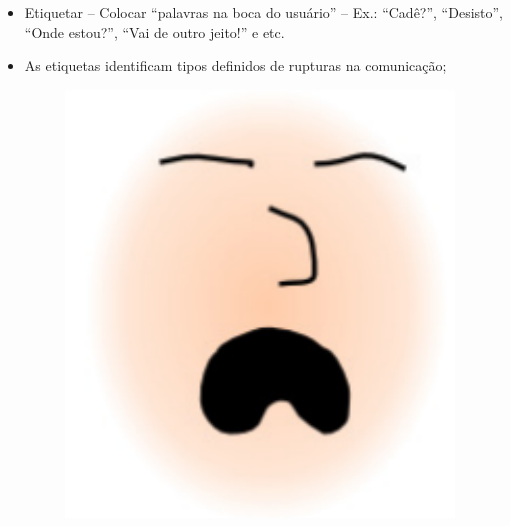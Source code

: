 \begin{enumerate}
\begin{itemize}
    \item Etiquetar -- Colocar ``palavras na boca do usuário'' --
        Ex.: ``Cadê?'', ``Desisto'', ``Onde estou?'', ``Vai de outro jeito!'' e etc.
    \item As etiquetas identificam tipos definidos de rupturas na comunicação; \\
        \begin{figure}[h]
            \begin{minipage}{.4\textwidth}
                \hfill
                \includegraphics[scale=.5]{LixoSono}
                \vfill
            \end{minipage} 
            \begin{minipage}{.6\textwidth}

\end{minipage}
\end{figure}
\end{itemize}
\end{enumerate}
